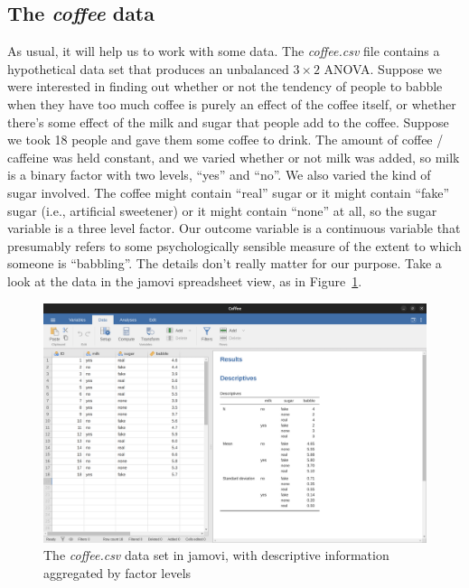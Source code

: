 \documentclass[
  a4paper,
]{book}
\begin{document}
\hypertarget{the-coffee-data}{%
\subsection{\texorpdfstring{The \emph{coffee}
data}{The coffee data}}\label{the-coffee-data}}

As usual, it will help us to work with some data. The \emph{coffee.csv}
file contains a hypothetical data set that produces an unbalanced
\(3 \times 2\) ANOVA. Suppose we were interested in finding out whether
or not the tendency of people to babble when they have too much coffee
is purely an effect of the coffee itself, or whether there's some effect
of the milk and sugar that people add to the coffee. Suppose we took 18
people and gave them some coffee to drink. The amount of coffee /
caffeine was held constant, and we varied whether or not milk was added,
so milk is a binary factor with two levels, ``yes'' and ``no''. We also
varied the kind of sugar involved. The coffee might contain ``real''
sugar or it might contain ``fake'' sugar (i.e., artificial sweetener) or
it might contain ``none'' at all, so the sugar variable is a three level
factor. Our outcome variable is a continuous variable that presumably
refers to some psychologically sensible measure of the extent to which
someone is ``babbling''. The details don't really matter for our
purpose. Take a look at the data in the jamovi spreadsheet view, as in
Figure~\ref{fig-fig14-26}.

\begin{figure}

\includegraphics[width=1\textwidth,height=\textheight]{images/fig14-26.png} \hfill{}

\caption{\label{fig-fig14-26}The \emph{coffee.csv} data set in jamovi,
with descriptive information aggregated by factor levels}

\end{figure}
\end{document}
